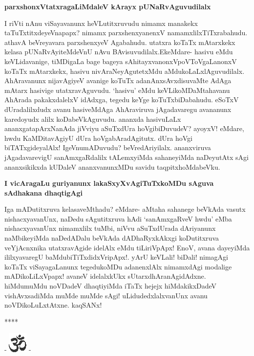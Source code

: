{\bigskip
\noindent
{\large\bf parxshonxVtatxragaLiMdaleV kArayx pUNaRvAguvudilalx}}\label{page213}
\medskip

\noindent
I riVti nAnu viSayavanunx heVLutitxruvudu nimamx manakekx taTuTxtitxdeyeVnapapx? \hbox{nimamx} parxshenx\-yanenxV namamxlilxTiTxrabahudu. athavA beVreyavara parxshenxyeV Agabahudu. utatxra koTaTx mAtarxkekx kelasa pUNaR\-vAyiteMdeVnU nAvu BAvisuvudilalx.\break EkeMdare- hasivu eMdu keVLidavanige, tiMDigaLa bage bageya sAhitayxvanonxV\break poVToV\-gaLanonxV koTaTx mAtarxkekx, hasivu nivAraNeyAgutetxMdu aMdukoLaLx\-\break\-lAguvu\-dilalx. AhAravanunx nijavAgiyeV avanige koTuTx adanAnxsAvxdisuvaMte AdAga mAtarx hasivige utatxra\-vAguvudu. `hasivu' eMdu keVLikoMDaMtaha\-vanu AhArada pakakxdalelxV idAdxga, tegedu keYge koTuTxbiDa\-bahudu. eSoTxV dUra\-dalilxdudx avanu hasiveMdAga AhAraviruva jAgadavaregu avananunx karedoyudx alilx koDabeVkAguvudu. ananxda hasivuLaLx ananxgatapArxNanAda jiVviyu aSuTxdUra hoVgibiDuvudeV? ayoyxV! eMdare, hwdu KaMDitavAgiyU dUra hoVgabAradAgitutx. dUra hoVgi biTATxgideyalAlx! IgeVnumADuvudu? beVredAriyilalx. ananxviruva jAgadavarevigU sanAmxgaRdalilx tALemxyiMda sahane\-yiMda naDeyutAtx sAgi ananxsikikxda kUDaleV ananxvanunxMDu savidu taqpitxhoMdabeVku.

{\bigskip
\noindent
{\large\bf I vicAragaLu guriyanunx lakaSxyXvAgiTuTxkoMDu sAguva sAdhakana dhaqtigAgi}}\label{page218}
\medskip

\noindent
Iga mADutitxruva kelasaveMthadu? eMdare- aMtaha sahanege beVkAda vasutx nishacxyavanUnx, naDedu\- sAgutitxruva hAdi `sanAmxgaRveV hwdu' eMba nishacxyavanUnx nimamxlilx tuMbi, niVvu aSuTxdUrada dAri\-yanunx naMbikeyiMda naDedADalu beVkAda dADhaRyxkAkxgi koDutitxruva veYjAcnxnika utatxravAgide idelAlx eMdu tiLiriVpApx! EnoV, avana dayeyiMda ililxyavaregU baMdubiTiTxdidxVripApx!. yArU keVLali! biDali! nimagAgi koTaTx viSayagaLanunx tegedukoMDu adanenxlAlx nimamxdAgi modalige mADikoLiLxVpapx! avaneV idelalxkUkx sUtarxdhAranAgidAdxne. hiMdumuMdu noVDadeV dhaqtiyiMda iTaTx hejejx hiMdakikxDadeV vishAvxsadiMda muMde muMde sAgi! uLidudedxlalxvanUnx avanu noVDikoLuLxtAtxne. kaqSANx!

\medskip

\begin{center}
****
\end{center}

\newpage

\begin{center}
- \includegraphics{om.eps} -
\end{center}

